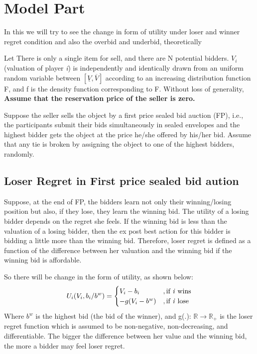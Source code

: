 \documentclass[10pt,a4paper,oneside]{report}
\begin{document}
\section{Model Part}
In this we will try to see the change in form of utility under loser and winner regret condition and also the overbid and underbid, theoretically

\noindent Let There is only a single item for sell, and there are N potential bidders. $V_i$ (valuation of player \textit{i}) is independently and identically drawn from an uniform random variable between $[\underline{V},\overline{V}]$ according to an increasing distribution function F, and f is the density function corresponding to F. Without loss of generality,
\textbf{Assume that the reservation price of the seller is zero.}

\noindent Suppose the seller sells the object by a first price sealed bid auction (FP), i.e., the participants submit their bids simultaneously in sealed envelopes and the highest bidder gets the object at the price he/she offered by his/her bid. Assume that any tie is broken by assigning the object to one of the highest bidders, randomly.

\subsection{Loser Regret in First price sealed bid aution}
Suppose, at the end of FP, the bidders learn not only their winning/losing position but also, if they lose, they learn the winning bid. The utility of a losing bidder depends on the regret she feels. If the winning bid is less than the valuation of a losing bidder, then the ex post best action for this bidder is bidding a little more than the winning bid. Therefore, loser regret is defined as a function of the difference between her valuation and the winning bid if the winning bid is affordable.

\noindent So there will be change in the form of utility, as shown below:\citep{filizy2005auctions}
\begin{equation*}
U_i(V_i,b_i/b^w) =  
\begin{cases}
V_i-b_i &,\text{if \textit{i} wins}
\\
-g(V_i-b^w)&,\text{if \textit{i} lose}	
\end{cases}
\end{equation*}
Where $b^w$ is the highest bid (the bid of the winner), and g(.): $\mathds{R} \to \mathds{R}_+$ is the loser regret function which is assumed to be non-negative, non-decreasing, and differentiable. The bigger the difference between her value and the winning bid, the more a bidder may feel loser regret.
\end{document}
